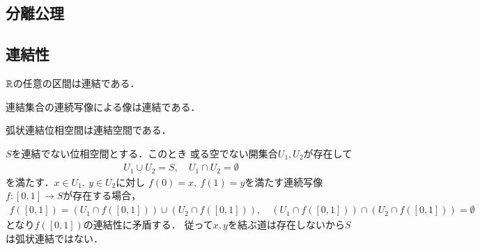 \subsection{分離公理}
	
\subsection{連結性}
	
	\begin{screen}
		\begin{thm}
			$\mathbb{R}$の任意の区間は連結である．
		\end{thm}
	\end{screen}
	
	\begin{screen}
		\begin{thm}
			連結集合の連続写像による像は連結である．
		\end{thm}
	\end{screen}
	
	\begin{screen}
		\begin{thm}[弧状連結なら連結]\label{thm:connected_path_connected}
			弧状連結位相空間は連結空間である．
		\end{thm}
	\end{screen}
	
	\begin{prf}
		$S$を連結でない位相空間とする．このとき
		或る空でない開集合$U_1,U_2$が存在して
		\begin{align}
			U_1 \cup U_2 = S,
			\quad U_1 \cap U_2 = \emptyset
		\end{align}
		を満たす．$x \in U_1,\ y \in U_2$に対し
		$f(0) = x,\ f(1) = y$を満たす連続写像
		$f:[0,1] \longrightarrow S$が存在する場合，
		\begin{align}
			f([0,1]) = \left( U_1 \cap f([0,1]) \right) \cup \left( U_2 \cap f([0,1]) \right),
			\quad \left( U_1 \cap f([0,1]) \right) \cap \left( U_2 \cap f([0,1]) \right) = \emptyset
		\end{align}
		となり$f([0,1])$の連結性に矛盾する．
		従って$x,y$を結ぶ道は存在しないから$S$は弧状連結ではない．
		\QED
	\end{prf}